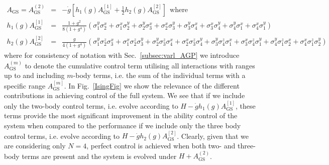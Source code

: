 \begin{eqnarray}
A_\text{GS} = A_\text{GS}^{(2)} &=& -\dot{g} \left[ h_1(g) A_\text{GS}^{[1]} + \frac{1}{2} h_2(g) A_\text{GS}^{[2]}  \right]~~\text{where} \label{eq:HCDIsingFull} \\
h_1(g) A_\text{GS}^{[1]} &=& \frac{1 + g^2}{8(1+g^4)} \left( \sigma^y_1\sigma_2^x + \sigma^x_1\sigma_2^y + \sigma^y_2\sigma_3^x + \sigma^x_2\sigma_3^y+ \sigma^y_3\sigma_4^x + \sigma^x_3\sigma_4^y + \sigma^y_4\sigma_1^x + \sigma^x_4\sigma_1^y \right) \label{eq:HCDIsing2body} \\ 
h_2(g) A_\text{GS}^{[2]} &=&  \frac{g}{4(1+g^4)} \left( 
\sigma^y_1\sigma_2^z\sigma_3^x + \sigma^x_1\sigma_2^z\sigma_3^y + 
\sigma^y_2\sigma_3^z\sigma_4^x + \sigma^x_2\sigma_3^z\sigma_4^y +
\sigma^y_3\sigma_4^z\sigma_1^x + \sigma^x_3\sigma_4^z\sigma_1^y +
\sigma^y_4\sigma_1^z\sigma_2^x + \sigma^x_4\sigma_1^z\sigma_2^y\right) \label{eq:HCDIsing3body}
\end{eqnarray}
where for consistency of notation with Sec.~\ref{subsec:varl_AGP} we introduce $A_\text{GS}^{(m)}$ to denote the cumulative control term utilising all interactions with ranges up to and including $m$-body terms, i.e. the sum of the individual terms with a specific range $A_\text{GS}^{[m]}$. In Fig.~\ref{IsingFig} we show the relevance of the different contributions in achieving control of the full system. We see that if we include only the two-body control terms, i.e. evolve according to $H-\dot{g}h_1(g)A_\text{GS}^{[1]}$, these terms provide the most significant improvement in the ability control of the system when compared to the performance if we include only the three body control terms, i.e. evolve according to $H-\dot{g}h_2(g)A_\text{GS}^{[2]}$. Clearly, given that we are considering only $N\!=\!4$, perfect control is achieved when both two- and three-body terms are present and the system is evolved under $H+A_\text{GS}^{(2)}$. 

